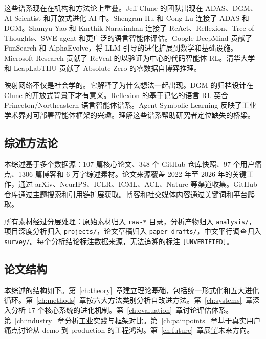 这些谱系现在在机构和方法论上重叠。Jeff Clune 的团队出现在 ADAS、DGM、AI Scientist 和开放式进化 AI 中。Shengran Hu 和 Cong Lu 连接了 ADAS 和 DGM。Shunyu Yao 和 Karthik Narasimhan 连接了 ReAct、Reflexion、Tree of Thoughts、SWE-agent 和更广泛的语言智能体评估。Google DeepMind 贡献了 FunSearch 和 AlphaEvolve，将 LLM 引导的进化扩展到数学和基础设施。Microsoft Research 贡献了 ReVeal 的以验证为中心的代码智能体 RL。清华大学和 LeapLabTHU 贡献了 Absolute Zero 的零数据自博弈推理。

映射网络不仅是社会学的。它解释了为什么想法一起出现。DGM 的归档设计在 Clune 的开放式背景下才有意义。Reflexion 的基于记忆的语言 RL 契合 Princeton/Northeastern 语言智能体谱系。Agent Symbolic Learning 反映了工业-学术界对可部署智能体框架的兴趣。理解这些谱系帮助研究者定位缺失的桥梁。

\subsection{综述方法论}\label{sec:intro-methodology}

本综述基于多个数据源：107 篇核心论文、348 个 GitHub 仓库快照、97 个用户痛点、1306 篇博客和 6 万字综述素材。论文来源覆盖 2022 年至 2026 年的关键工作，通过 arXiv、NeurIPS、ICLR、ICML、ACL、Nature 等渠道收集。GitHub 仓库通过主题搜索和引用链扩展获取。博客和社交媒体内容通过关键词和平台爬取。

所有素材经过分层处理：原始素材归入 \texttt{raw-*} 目录，分析产物归入 \texttt{analysis/}，项目深度分析归入 \texttt{projects/}，论文草稿归入 \texttt{paper-drafts/}，中文平行调查归入 \texttt{survey/}。每个分析结论标注数据来源，无法追溯的标注 \texttt{[UNVERIFIED]}。

\subsection{论文结构}\label{sec:intro-structure}

本综述的结构如下。第~\ref{ch:theory}~章建立理论基础，包括统一形式化和五大进化循环。第~\ref{ch:methods}~章按六大方法类别分析自改进方法。第~\ref{ch:systems}~章深入分析 17 个核心系统的进化机制。第~\ref{ch:evaluation}~章讨论评估体系。第~\ref{ch:industry}~章分析工业实践与框架对比。第~\ref{ch:painpoints}~章基于真实用户痛点讨论从 demo 到 production 的工程鸿沟。第~\ref{ch:future}~章展望未来方向。
